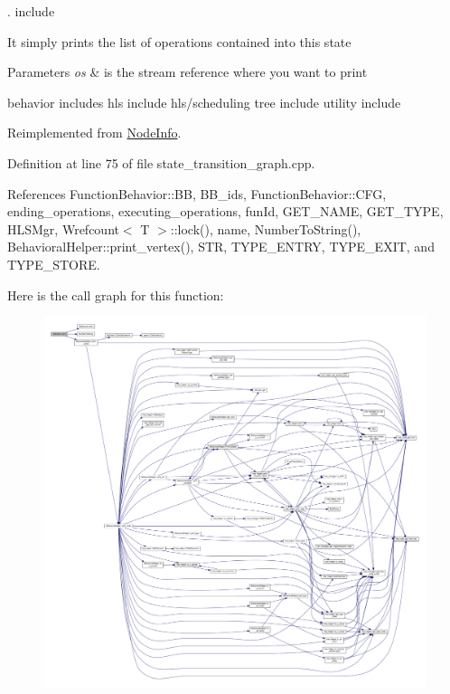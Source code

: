 . include

It simply prints the list of operations contained into this state 
\begin{DoxyParams}{Parameters}
{\em os} & is the stream reference where you want to print\\
\hline
\end{DoxyParams}
behavior includes hls include hls/scheduling tree include utility include 

Reimplemented from \hyperlink{structNodeInfo_adacfeaff90018a35bde5211edbbd1114}{Node\+Info}.



Definition at line 75 of file state\+\_\+transition\+\_\+graph.\+cpp.



References Function\+Behavior\+::\+BB, B\+B\+\_\+ids, Function\+Behavior\+::\+C\+FG, ending\+\_\+operations, executing\+\_\+operations, fun\+Id, G\+E\+T\+\_\+\+N\+A\+ME, G\+E\+T\+\_\+\+T\+Y\+PE, H\+L\+S\+Mgr, Wrefcount$<$ T $>$\+::lock(), name, Number\+To\+String(), Behavioral\+Helper\+::print\+\_\+vertex(), S\+TR, T\+Y\+P\+E\+\_\+\+E\+N\+T\+RY, T\+Y\+P\+E\+\_\+\+E\+X\+IT, and T\+Y\+P\+E\+\_\+\+S\+T\+O\+RE.

Here is the call graph for this function\+:
\nopagebreak
\begin{figure}[H]
\begin{center}
\leavevmode
\includegraphics[width=350pt]{d3/dbd/structStateInfo_af50fac3fb978c2de96361a42d8087962_cgraph}
\end{center}
\end{figure}



